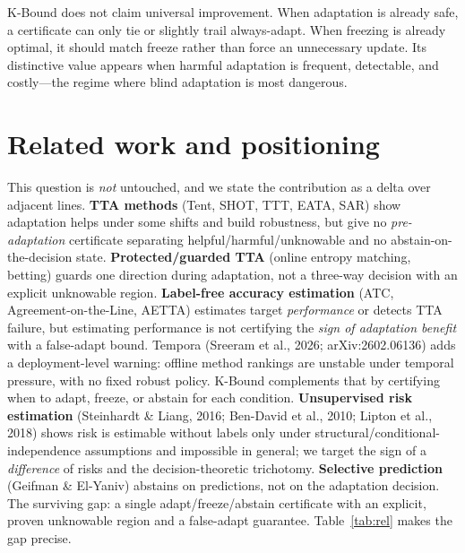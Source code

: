 \documentclass[11pt]{article}
\theoremstyle{plain}
\theoremstyle{definition}
\begin{document}
K-Bound does not claim universal improvement. When adaptation is already safe, a
certificate can only tie or slightly trail always-adapt. When freezing is already
optimal, it should match freeze rather than force an unnecessary update. Its
distinctive value appears when harmful adaptation is frequent, detectable, and
costly---the regime where blind adaptation is most dangerous.

\section{Related work and positioning}
This question is \emph{not} untouched, and we state the contribution as a delta over
adjacent lines. \textbf{TTA methods} (Tent, SHOT, TTT, EATA, SAR) show adaptation
helps under some shifts and build robustness, but give no \emph{pre-adaptation}
certificate separating helpful/harmful/unknowable and no abstain-on-the-decision
state. \textbf{Protected/guarded TTA} (online entropy matching, betting) guards one
direction during adaptation, not a three-way decision with an explicit unknowable
region. \textbf{Label-free accuracy estimation} (ATC, Agreement-on-the-Line, AETTA)
estimates target \emph{performance} or detects TTA failure, but estimating performance
is not certifying the \emph{sign of adaptation benefit} with a false-adapt bound.
Tempora (Sreeram et al., 2026; arXiv:2602.06136) adds a deployment-level warning:
offline method rankings are unstable under temporal pressure, with no fixed robust
policy. K-Bound complements that by certifying when to adapt, freeze, or abstain for
each condition.
\textbf{Unsupervised risk estimation} (Steinhardt \& Liang, 2016; Ben-David et al.,
2010; Lipton et al., 2018) shows risk is estimable without labels only under
structural/conditional-independence assumptions and impossible in general; we target
the sign of a \emph{difference} of risks and the decision-theoretic trichotomy.
\textbf{Selective prediction} (Geifman \& El-Yaniv) abstains on predictions, not on the
adaptation decision. The surviving gap: a single adapt/freeze/abstain certificate with
an explicit, proven unknowable region and a false-adapt guarantee. Table~\ref{tab:rel}
makes the gap precise.
\end{document}
